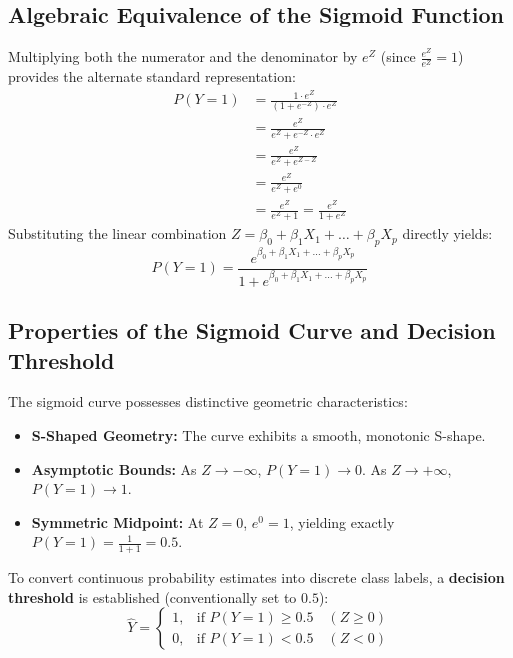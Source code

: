 \subsection{Algebraic Equivalence of the Sigmoid Function}
Multiplying both the numerator and the denominator by $e^Z$ (since $\frac{e^Z}{e^Z} = 1$) provides the alternate standard representation:
\begin{align}
P(Y=1) &= \frac{1 \cdot e^Z}{(1 + e^{-Z}) \cdot e^Z} \\
&= \frac{e^Z}{e^Z + e^{-Z} \cdot e^Z} \\
&= \frac{e^Z}{e^Z + e^{Z - Z}} \\
&= \frac{e^Z}{e^Z + e^0} \\
&= \frac{e^Z}{e^Z + 1} = \frac{e^Z}{1 + e^Z}
\end{align}
Substituting the linear combination $Z = \beta_0 + \beta_1 X_1 + \dots + \beta_p X_p$ directly yields:
\begin{equation}
P(Y=1) = \frac{e^{\beta_0 + \beta_1 X_1 + \dots + \beta_p X_p}}{1 + e^{\beta_0 + \beta_1 X_1 + \dots + \beta_p X_p}}
\end{equation}

\subsection{Properties of the Sigmoid Curve and Decision Threshold}
The sigmoid curve possesses distinctive geometric characteristics:
\begin{itemize}
    \item \textbf{S-Shaped Geometry:} The curve exhibits a smooth, monotonic S-shape.
    \item \textbf{Asymptotic Bounds:} As $Z \to -\infty$, $P(Y=1) \to 0$. As $Z \to +\infty$, $P(Y=1) \to 1$.
    \item \textbf{Symmetric Midpoint:} At $Z = 0$, $e^0 = 1$, yielding exactly $P(Y=1) = \frac{1}{1+1} = 0.5$.
\end{itemize}

To convert continuous probability estimates into discrete class labels, a \textbf{decision threshold} is established (conventionally set to $0.5$):
\begin{equation}
\hat{Y} = 
\begin{cases}
1, & \text{if } P(Y=1) \ge 0.5 \quad (Z \ge 0) \\
0, & \text{if } P(Y=1) < 0.5 \quad (Z < 0)
\end{cases}
\end{equation}

